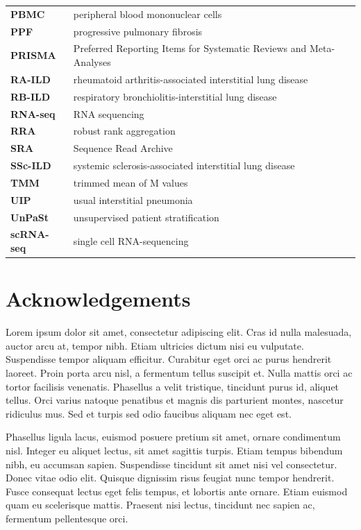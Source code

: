 \documentclass[
]{article}
\begin{document}
\begin{longtable}{>{}ll}
\textbf{PBMC} & peripheral blood mononuclear cells\\
\textbf{PPF} & progressive pulmonary fibrosis\\
\textbf{PRISMA} & Preferred Reporting Items for Systematic Reviews and Meta-Analyses\\
\addlinespace
\textbf{RA-ILD} & rheumatoid arthritis-associated interstitial lung disease\\
\textbf{RB-ILD} & respiratory bronchiolitis-interstitial lung disease\\
\textbf{RNA-seq} & RNA sequencing\\
\textbf{RRA} & robust rank aggregation\\
\textbf{SRA} & Sequence Read Archive\\
\addlinespace
\textbf{SSc-ILD} & systemic sclerosis-associated interstitial lung disease\\
\textbf{TMM} & trimmed mean of M values\\
\textbf{UIP} & usual interstitial pneumonia\\
\textbf{UnPaSt} & unsupervised patient stratification\\
\textbf{scRNA-seq} & single cell RNA-sequencing\\

\end{longtable}

\clearpage

\section*{Acknowledgements}

Lorem ipsum dolor sit amet, consectetur adipiscing elit. Cras id nulla malesuada, auctor arcu at, tempor nibh. Etiam ultricies dictum nisi eu vulputate. Suspendisse tempor aliquam efficitur. Curabitur eget orci ac purus hendrerit laoreet. Proin porta arcu nisl, a fermentum tellus suscipit et. Nulla mattis orci ac tortor facilisis venenatis. Phasellus a velit tristique, tincidunt purus id, aliquet tellus. Orci varius natoque penatibus et magnis dis parturient montes, nascetur ridiculus mus. Sed et turpis sed odio faucibus aliquam nec eget est.

Phasellus ligula lacus, euismod posuere pretium sit amet, ornare condimentum nisl. Integer eu aliquet lectus, sit amet sagittis turpis. Etiam tempus bibendum nibh, eu accumsan sapien. Suspendisse tincidunt sit amet nisi vel consectetur. Donec vitae odio elit. Quisque dignissim risus feugiat nunc tempor hendrerit. Fusce consequat lectus eget felis tempus, et lobortis ante ornare. Etiam euismod quam eu scelerisque mattis. Praesent nisi lectus, tincidunt nec sapien ac, fermentum pellentesque orci.
\end{document}
